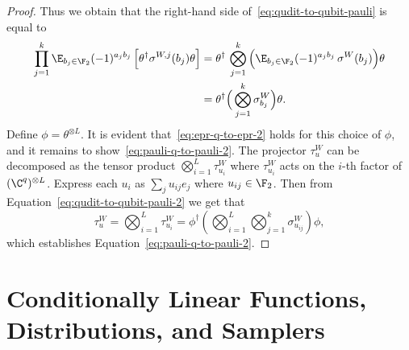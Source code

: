 \begin{proof}
  Thus we obtain that the right-hand side of~\eqref{eq:qudit-to-qubit-pauli} is
  equal to
  \begin{align}
		\prod_{j=1}^k \E_{b_j \in \F_2} (-1)^{a_j b_j} \,
    \Big [ \theta^\dagger \sigma^{W,j}(b_j) \theta \Big ]
    & = \theta^\dagger \, \bigotimes_{j=1}^k
      \Big ( \E_{b_j \in \F_2} (-1)^{a_j b_j} \, \sigma^{W}(b_j) \Big) \theta \\
		& = \theta^\dagger \Big (\bigotimes_{j=1}^k \sigma^W_{b_j} \Big) \theta.
		\label{eq:qudit-to-qubit-pauli-2}
  \end{align}
  Define $\phi = \theta^{\otimes L}$. It is evident
  that~\eqref{eq:epr-q-to-epr-2} holds for this choice of $\phi$, and
  it remains to show~\eqref{eq:pauli-q-to-pauli-2}. The projector $\tau^W_u$ can be
  decomposed as the tensor product $\bigotimes_{i=1}^L \tau^{W}_{u_i}$
  where $\tau^{W}_{u_i}$ acts on the $i$-th factor of $(\C^q)^{\otimes L}$.
  Express each $u_i$ as $\sum_j u_{ij} e_j$ where $u_{ij} \in \F_2$. Then from
  Equation~\eqref{eq:qudit-to-qubit-pauli-2} we get that
  \begin{equation}
  	\tau^W_u = \bigotimes_{i=1}^L \tau^W_{u_i}
    = \phi^\dagger \left( \bigotimes_{i=1}^L
      \bigotimes_{j=1}^k \sigma^W_{u_{ij}} \right) \phi,
  \end{equation}
  which establishes Equation~\eqref{eq:pauli-q-to-pauli-2}. 
\end{proof}


 
\section{Conditionally Linear Functions, Distributions, and Samplers}
